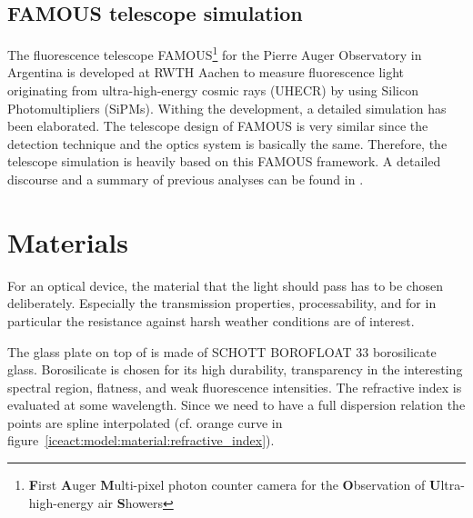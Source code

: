 \subsection{FAMOUS telescope simulation}\label{sec:famous_simulation}
The fluorescence telescope FAMOUS\footnote{\textbf{F}irst \textbf{A}uger \textbf{M}ulti-pixel
photon counter camera for the \textbf{O}bservation of \textbf{U}ltra-high-energy air \textbf{S}howers} for the Pierre Auger Observatory in Argentina is developed at RWTH Aachen to measure fluorescence light originating from ultra-high-energy cosmic rays (UHECR) by using Silicon Photomultipliers (SiPMs). Withing the development, a detailed \geant simulation has been elaborated. \cite{famous:sim_github,famous:sim_github} The telescope design of FAMOUS is very similar since the detection technique and the optics system is basically the same. Therefore, the \iceact telescope simulation is heavily based on this FAMOUS \geant framework. A detailed discourse and a summary of previous analyses can be found in \cite{famous:niggemann}.

\section{Materials}\label{sec:iceact:model:material}

For an optical device, the material that the light should pass has to be chosen deliberately. Especially the transmission properties, processability, and for \iceact in particular the resistance against harsh weather conditions are of interest.

The glass plate on top of \iceact is made of SCHOTT BOROFLOAT\textsuperscript{\textregistered} 33 borosilicate glass. Borosilicate is chosen for its high durability, transparency in the interesting spectral region, flatness, and weak fluorescence intensities. The refractive index is evaluated at some wavelength. Since we need to have a full dispersion relation the points are spline interpolated (cf. orange curve in figure~\ref{iceact:model:material:refractive_index}).~\cite{iceact:borosilicate:datasheet}

